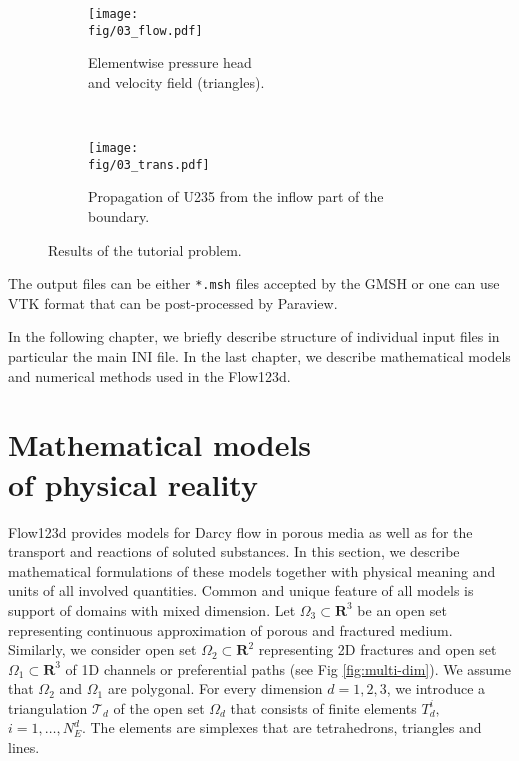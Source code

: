 \documentclass[12pt,a4paper]{report}
\def\Real{{\mathbf R}}
\def\fig{figures}
\begin{document}
\begin{figure}
    \centering
    \begin{subfigure}[b]{0.45\textwidth}
        \centering
        \texttt{[image: \\fig/03\_flow.pdf]}
        \caption{Elementwise pressure head\\and velocity field (triangles).}
        \label{fig:tut-flow}
    \end{subfigure}
    ~
    \begin{subfigure}[b]{0.45\textwidth}
        \centering
        \texttt{[image: \\fig/03\_trans.pdf]}
        \caption{Propagation of U235 from the inflow part of the boundary.}
        \label{fig:tut-trans}
    \end{subfigure}
    \caption{Results of the tutorial problem.}
    \label{fig:tutorial}
\end{figure}



The output files can be either \verb'*.msh' files accepted by the GMSH or one can use VTK format that can be post-processed by Paraview.

In the following chapter, we briefly describe structure of individual input files in particular the main INI file. In the last chapter, we describe
mathematical models and numerical methods used in the Flow123d.


\chapter{Mathematical models \\of physical reality}
\label{PhysicalModels}

Flow123d provides models for Darcy flow in porous media as well as for the transport and reactions of soluted substances. In this section, we describe 
mathematical formulations of these models together with physical meaning and units of all involved quantities. Common and unique feature of all models is support of
domains with mixed dimension. Let $\Omega_{3} \subset \Real^3$ be an open set representing continuous approximation of porous and fractured medium.
Similarly, we consider open set $\Omega_2\subset \Real^2$ representing 2D fractures and open set $\Omega_1\subset \Real^3$ of 1D channels or preferential paths 
(see Fig \ref{fig:multi-dim}).
We assume that $\Omega_2$ and $\Omega_1$ are polygonal. For every dimension $d=1,2,3$, we introduce a triangulation $\mathcal{T}_{d}$ of the open set $\Omega_d$
that consists of finite elements $T_{d}^{i},$\ $i = 1,\dots,N_{E}^{d}$. The elements are simplexes that are tetrahedrons, triangles and lines.
\end{document}
